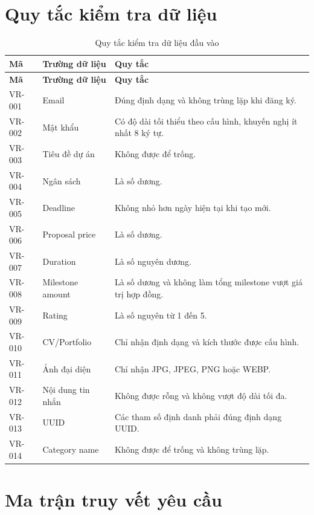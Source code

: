 \section{Quy tắc kiểm tra dữ liệu}
\label{sec:validation-rules}

\begin{longtable}{|p{2.0cm}|p{4.0cm}|p{7.8cm}|}
\caption{Quy tắc kiểm tra dữ liệu đầu vào}
\label{tab:validation-rules} \\ \hline
\textbf{Mã} & \textbf{Trường dữ liệu} & \textbf{Quy tắc} \\ \hline
\endfirsthead
\hline
\textbf{Mã} & \textbf{Trường dữ liệu} & \textbf{Quy tắc} \\ \hline
\endhead

VR-001 & Email & Đúng định dạng và không trùng lặp khi đăng ký. \\ \hline
VR-002 & Mật khẩu & Có độ dài tối thiểu theo cấu hình, khuyến nghị ít nhất 8 ký tự. \\ \hline
VR-003 & Tiêu đề dự án & Không được để trống. \\ \hline
VR-004 & Ngân sách & Là số dương. \\ \hline
VR-005 & Deadline & Không nhỏ hơn ngày hiện tại khi tạo mới. \\ \hline
VR-006 & Proposal price & Là số dương. \\ \hline
VR-007 & Duration & Là số nguyên dương. \\ \hline
VR-008 & Milestone amount & Là số dương và không làm tổng milestone vượt giá trị hợp đồng. \\ \hline
VR-009 & Rating & Là số nguyên từ 1 đến 5. \\ \hline
VR-010 & CV/Portfolio & Chỉ nhận định dạng và kích thước được cấu hình. \\ \hline
VR-011 & Ảnh đại diện & Chỉ nhận JPG, JPEG, PNG hoặc WEBP. \\ \hline
VR-012 & Nội dung tin nhắn & Không được rỗng và không vượt độ dài tối đa. \\ \hline
VR-013 & UUID & Các tham số định danh phải đúng định dạng UUID. \\ \hline
VR-014 & Category name & Không được để trống và không trùng lặp. \\ \hline
\end{longtable}

\section{Ma trận truy vết yêu cầu}
\label{sec:traceability-matrix}

